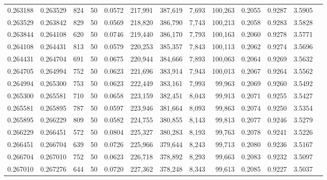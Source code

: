 \begin{tabular}{rrrrrrrrrrrrr}
0.263188 & 0.263529 &   824 &  50 &                                     0.0572 & 217,991 & 387,619 &   7,693 & 100,263 & 0.2055 & 0.9287 & 3.5905 \\
0.263529 & 0.263842 &   829 &  50 &                                     0.0569 & 218,820 & 386,790 &   7,743 & 100,213 & 0.2058 & 0.9283 & 3.5828 \\
0.263844 & 0.264108 &   620 &  50 &                                     0.0746 & 219,440 & 386,170 &   7,793 & 100,163 & 0.2060 & 0.9278 & 3.5771 \\
0.264108 & 0.264431 &   813 &  50 &                                     0.0579 & 220,253 & 385,357 &   7,843 & 100,113 & 0.2062 & 0.9274 & 3.5696 \\
0.264431 & 0.264704 &   691 &  50 &                                     0.0675 & 220,944 & 384,666 &   7,893 & 100,063 & 0.2064 & 0.9269 & 3.5632 \\
0.264705 & 0.264994 &   752 &  50 &                                     0.0623 & 221,696 & 383,914 &   7,943 & 100,013 & 0.2067 & 0.9264 & 3.5562 \\
0.264994 & 0.265300 &   753 &  50 &                                     0.0623 & 222,449 & 383,161 &   7,993 &  99,963 & 0.2069 & 0.9260 & 3.5492 \\
0.265300 & 0.265581 &   710 &  50 &                                     0.0658 & 223,159 & 382,451 &   8,043 &  99,913 & 0.2071 & 0.9255 & 3.5427 \\
0.265581 & 0.265895 &   787 &  50 &                                     0.0597 & 223,946 & 381,664 &   8,093 &  99,863 & 0.2074 & 0.9250 & 3.5354 \\
0.265895 & 0.266229 &   809 &  50 &                                     0.0582 & 224,755 & 380,855 &   8,143 &  99,813 & 0.2077 & 0.9246 & 3.5279 \\
0.266229 & 0.266451 &   572 &  50 &                                     0.0804 & 225,327 & 380,283 &   8,193 &  99,763 & 0.2078 & 0.9241 & 3.5226 \\
0.266451 & 0.266704 &   639 &  50 &                                     0.0726 & 225,966 & 379,644 &   8,243 &  99,713 & 0.2080 & 0.9236 & 3.5167 \\
0.266704 & 0.267010 &   752 &  50 &                                     0.0623 & 226,718 & 378,892 &   8,293 &  99,663 & 0.2083 & 0.9232 & 3.5097 \\
0.267010 & 0.267276 &   644 &  50 &                                     0.0720 & 227,362 & 378,248 &   8,343 &  99,613 & 0.2085 & 0.9227 & 3.5037 \\

\end{tabular}
